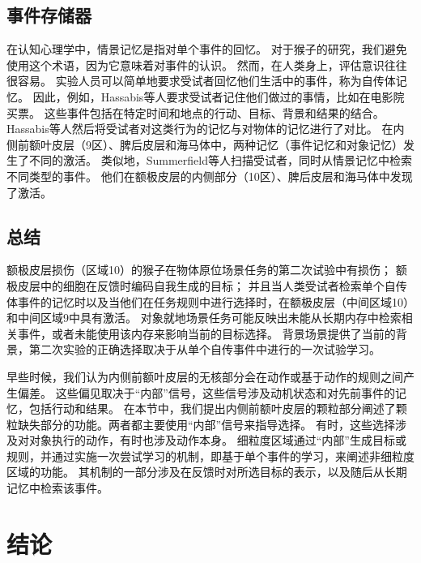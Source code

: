 \subsection{事件存储器}

在认知心理学中，情景记忆是指对单个事件的回忆。
对于猴子的研究，我们避免使用这个术语，因为它意味着对事件的认识。
然而，在人类身上，评估意识往往很容易。
实验人员可以简单地要求受试者回忆他们生活中的事件，称为自传体记忆。
因此，例如，Hassabis等人\cite{hassabis2007using}要求受试者记住他们做过的事情，比如在电影院买票。
这些事件包括在特定时间和地点的行动、目标、背景和结果的结合。
Hassabis等人然后将受试者对这类行为的记忆与对物体的记忆进行了对比。
在内侧前额叶皮层（9区）、脾后皮层和海马体中，两种记忆（事件记忆和对象记忆）发生了不同的激活。
类似地，Summerfield等人\cite{summerfield2009decision}扫描受试者，同时从情景记忆中检索不同类型的事件。
他们在额极皮层的内侧部分（10区）、脾后皮层和海马体中发现了激活。\par



\subsection{总结}

额极皮层损伤（区域10）的猴子在物体原位场景任务的第二次试验中有损伤；
额极皮层中的细胞在反馈时编码自我生成的目标；
并且当人类受试者检索单个自传体事件的记忆时以及当他们在任务规则中进行选择时，在额极皮层（中间区域10）和中间区域9中具有激活。
对象就地场景任务可能反映出未能从长期内存中检索相关事件，或者未能使用该内存来影响当前的目标选择。
背景场景提供了当前的背景，第二次实验的正确选择取决于从单个自传事件中进行的一次试验学习。\par


早些时候，我们认为内侧前额叶皮层的无核部分会在动作或基于动作的规则之间产生偏差。
这些偏见取决于“内部”信号，这些信号涉及动机状态和对先前事件的记忆，包括行动和结果。
在本节中，我们提出内侧前额叶皮层的颗粒部分阐述了颗粒缺失部分的功能。两者都主要使用“内部”信号来指导选择。
有时，这些选择涉及对对象执行的动作，有时也涉及动作本身。
细粒度区域通过“内部”生成目标或规则，并通过实施一次尝试学习的机制，即基于单个事件的学习，来阐述非细粒度区域的功能。
其机制的一部分涉及在反馈时对所选目标的表示，以及随后从长期记忆中检索该事件。\par



\section{结论}

